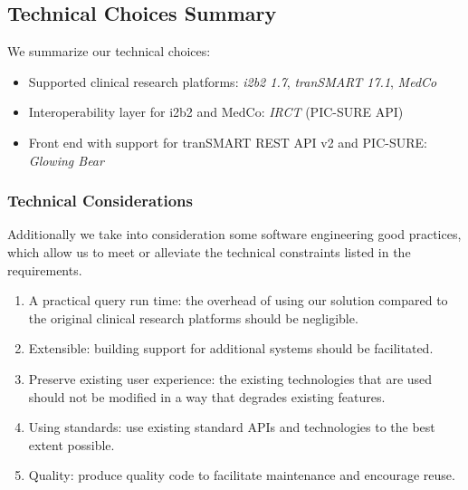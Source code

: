 \subsection{Technical Choices Summary}

We summarize our technical choices:

\begin{itemize}
    \setlength\itemsep{0em}
    \item Supported clinical research platforms: \emph{i2b2 1.7}, \emph{tranSMART 17.1}, \emph{MedCo}
    \item Interoperability layer for i2b2 and MedCo: \emph{IRCT} (PIC-SURE API)
    \item Front end with support for tranSMART REST API v2 and PIC-SURE: \emph{Glowing Bear}
\end{itemize}


\begin{samepage}
\subsubsection*{Technical Considerations}

Additionally we take into consideration some software engineering good practices, which allow us to meet or alleviate the technical constraints listed in the requirements.
\begin{enumerate}
    \item A practical query run time: the overhead of using our solution compared to the original clinical research platforms should be negligible.
    \item Extensible: building support for additional systems should be facilitated.
    \item Preserve existing user experience: the existing technologies that are used should not be modified in a way that degrades existing features.
    \item Using standards: use existing standard APIs and technologies to the best extent possible.
    \item Quality: produce quality code to facilitate maintenance and encourage reuse.
\end{enumerate}
\end{samepage}


